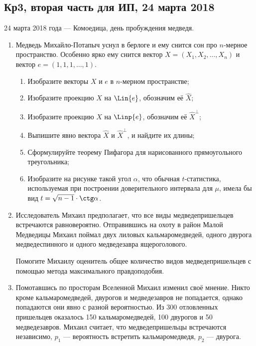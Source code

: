 \subsection{Кр3, вторая часть для ИП, 24 марта 2018}


24 марта 2018 года — Комоедица, день пробуждения медведя.


\begin{enumerate}
  \item Медведь Михайло-Потапыч уснул в берлоге и ему снится сон про $n$-мерное пространство.
    Особенно ярко ему снится вектор $X=(X_1, X_2, \ldots, X_n)$ и вектор $e=(1, 1, 1, \ldots, 1)$.
    \begin{enumerate}
      \item Изобразите векторы $X$ и $e$ в $n$-мерном пространстве;
      \item Изобразите проекцию $X$ на $\Lin \{e\}$, обозначим её $\hat X$;
      \item Изобразите проекцию $X$ на $\Linp \{e\}$, обозначим её $\hat X^{\perp}$;
      \item Выпишите явно вектора $\hat X$ и $\hat X^{\perp}$, и найдите их длины;
      \item Сформулируйте теорему Пифагора для нарисованного прямоугольного треугольника;
      \item Изобразите на рисунке такой угол $\alpha$, что обычная $t$-статистика, используемая при построении доверительного интервала для $\mu$, имела бы вид $t = \sqrt{n-1} \cdot \ctg \alpha$.
    \end{enumerate}

  \item Исследователь Михаил предполагает, что все виды медведепришельцев встречаются равновероятно.
    Отправившись на охоту в район Малой Медведицы Михаил поймал двух лиловых кальмаромедведей,
    одного двурога медведеспинного и одного медведезавра ящероголового.

      Помогите Михаилу оценитель общее количество видов медведепришельцев с помощью метода максимального правдоподобия.


    \item Помотавшись по просторам Вселенной Михаил изменил своё мнение.
      Никто кроме кальмаромедведей, двурогов и медведезавров не попадается, однако попадаются они явно с разной вероятностью.
      Из 300 отловленных пришельцев оказалось 150 кальмаромедведей, 100 двурогов и 50 медведезавров.
      Михаил считает, что медведепришельцы встречаются независимо, $p_1$ — вероятность встретить кальмаромедведя, $p_2$ — двурога.


\end{enumerate}
